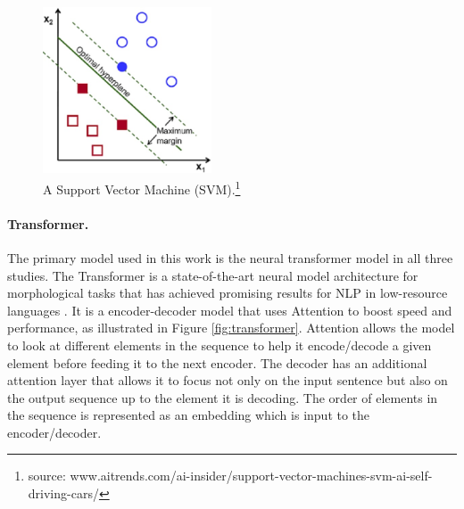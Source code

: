 
\begin{figure}[b]
    \centering
    \includegraphics[width=5cm]{figs/SVM1.jpg}
    \caption[Support Vector Machine]{A Support Vector Machine (SVM).\footnote{source: www.aitrends.com/ai-insider/support-vector-machines-svm-ai-self-driving-cars/}}
    \label{fig:SVM}
\end{figure}

\paragraph{Transformer.} 
The primary model used in this work is the neural transformer model \citep{vaswani_attention_2017} in all three studies. The Transformer is a state-of-the-art neural model architecture for morphological tasks \citep{vylomova2020sigmorphon} that has achieved promising results for NLP in low-resource languages \citep{abbott_towards_2018,Martinus2019AFO}. 
It is a encoder-decoder model that uses Attention to boost speed and performance, as illustrated in Figure \ref{fig:transformer}. Attention allows the model to look at different elements in the sequence to help it encode/decode a given element before feeding it to the next encoder. The decoder has an additional attention layer that allows it to focus not only on the input sentence but also on the output sequence up to the element it is decoding. The order of elements in the sequence is represented as an embedding which is input to the encoder/decoder. 

